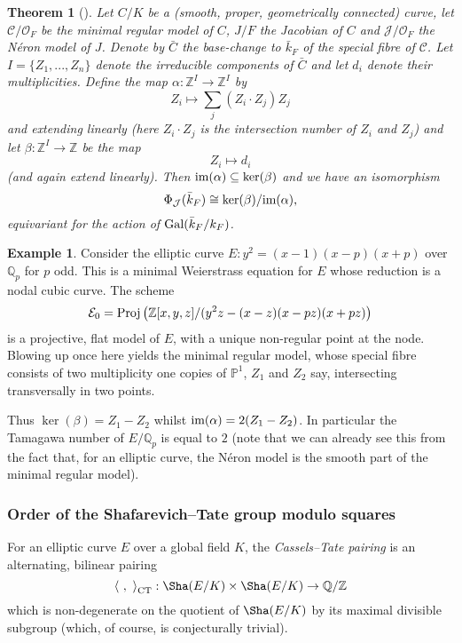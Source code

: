 \documentclass[12pt]{amsart}
\numberwithin{equation}{section}
\newtheorem{theorem}[equation]{Theorem}
\theoremstyle{remark}
\theoremstyle{definition}
\newtheorem{example}[equation]{Example}
\theoremstyle{definition}
\theoremstyle{definition}
\theoremstyle{definition}
\theoremstyle{definition}
\theoremstyle{definition}
\theoremstyle{definition}
\begin{document}
 \begin{theorem}[{\cite[Theorem 1.1]{MR1717533}}]
 
 Let $C/K$ be a (smooth, proper, geometrically connected) curve, let $\mathcal{C}/\mathcal{O}_F$ be the minimal regular model of $C$, $J/F$ the Jacobian of $C$ and $\mathcal{J}/\mathcal{O}_F$ the N\'{e}ron model of $J$. Denote by $\bar{C}$ the base-change to $\bar{k}_F$ of the special fibre of $\mathcal{C}$. Let $I=\{Z_1,...,Z_n\}$ denote the irreducible components of $\bar{C}$ and let $d_i$ denote their multiplicities. Define the map $\alpha:\mathbb{Z}^I\rightarrow \mathbb{Z}^I$
 by
 \[Z_i \mapsto \sum_j(Z_i\cdot Z_j)Z_j\]
 and extending linearly (here $Z_i\cdot Z_j$ is the intersection number of $Z_i$ and $Z_j$) 
 and let $\beta:\mathbb{Z}^I\rightarrow \mathbb{Z}$
 be the map \[Z_i \mapsto d_i\]
 (and again extend linearly). 
 Then $\textup{im}(\alpha)\subseteq \ker(\beta)$ and we have an isomorphism
 \[\Phi_{\mathcal{J}}(\bar{k}_F)\cong \ker(\beta)/\textup{im}(\alpha),\]
 equivariant for the action of $\textup{Gal}(\bar{k}_F/k_F)$.
 \end{theorem}
 
 \begin{example}
 Consider the elliptic curve $E:y^2=(x-1)(x-p)(x+p)$ over $\mathbb{Q}_p$ for $p$ odd. This is a minimal Weierstrass equation for $E$ whose reduction is a nodal cubic curve. The scheme 
 \[\mathcal{E}_0=\textup{Proj}\left(\mathbb{Z}[x,y,z]/(y^2z-(x-z)(x-pz)(x+pz)\right)\]
 is a projective, flat model of $E$, with a unique non-regular point at the node. Blowing up once here yields the minimal regular model, whose special fibre consists of two multiplicity one copies of $\mathbb{P}^1$, $Z_1$ and $Z_2$ say, intersecting transversally in two points.
 
 Thus $\ker(\beta)=Z_1-Z_2$ whilst $\textup{im}(\alpha)=2(Z_1-Z_2)$. In particular the Tamagawa number of $E/\mathbb{Q}_p$ is equal to $2$ (note that we can already see this from the fact that, for an elliptic curve, the N\'{e}ron model is the smooth part of the minimal regular model).  
 \end{example}


\subsubsection{Order of the Shafarevich--Tate group modulo squares}

For an elliptic curve $E$ over a global field $K$, the \textit{Cassels--Tate pairing} is an alternating, bilinear pairing
\[\left \langle ~,~\right \rangle_{\textup{CT}}:\Sha(E/K)\times \Sha(E/K)\rightarrow \mathbb{Q}/\mathbb{Z}\]
which is non-degenerate on the quotient of $\Sha(E/K)$ by its maximal divisible subgroup (which, of course, is conjecturally trivial). 
\end{document}
